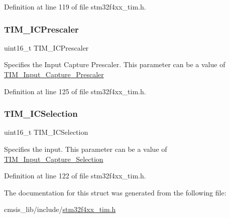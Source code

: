 Definition at line 119 of file stm32f4xx\+\_\+tim.\+h.

\mbox{\label{struct_t_i_m___i_c_init_type_def_abdff50beb0809a640ccf2cebde439a00}} 
\subsubsection{\texorpdfstring{T\+I\+M\+\_\+\+I\+C\+Prescaler}{TIM\_ICPrescaler}}
{\footnotesize\ttfamily uint16\+\_\+t T\+I\+M\+\_\+\+I\+C\+Prescaler}

Specifies the Input Capture Prescaler. This parameter can be a value of \hyperlink{group___t_i_m___input___capture___prescaler}{T\+I\+M\+\_\+\+Input\+\_\+\+Capture\+\_\+\+Prescaler} 

Definition at line 125 of file stm32f4xx\+\_\+tim.\+h.

\mbox{\label{struct_t_i_m___i_c_init_type_def_a052908740c8c618054ef82b3ec89e9b3}} 
\subsubsection{\texorpdfstring{T\+I\+M\+\_\+\+I\+C\+Selection}{TIM\_ICSelection}}
{\footnotesize\ttfamily uint16\+\_\+t T\+I\+M\+\_\+\+I\+C\+Selection}

Specifies the input. This parameter can be a value of \hyperlink{group___t_i_m___input___capture___selection}{T\+I\+M\+\_\+\+Input\+\_\+\+Capture\+\_\+\+Selection} 

Definition at line 122 of file stm32f4xx\+\_\+tim.\+h.



The documentation for this struct was generated from the following file\+:\begin{DoxyCompactItemize}
\item 
cmsis\+\_\+lib/include/\hyperlink{stm32f4xx__tim_8h}{stm32f4xx\+\_\+tim.\+h}\end{DoxyCompactItemize}

